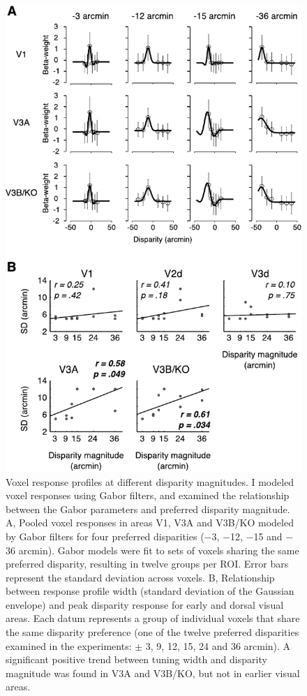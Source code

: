 \begin{figure}
  \centering
  \includegraphics{fig10}
  \caption[Voxel response profiles at different disparity magnitudes.]{Voxel response profiles at different disparity magnitudes. I modeled voxel responses using Gabor filters, and examined the relationship between the Gabor parameters and preferred disparity magnitude. A, Pooled voxel responses in areas V1, V3A and V3B/KO modeled by Gabor filters for four preferred disparities ($-$3, $-$12, $-$15 and $-$36 arcmin). Gabor models were fit to sets of voxels sharing the same preferred disparity, resulting in twelve groups per ROI. Error bars represent the standard deviation across voxels. B, Relationship between response profile width (standard deviation of the Gaussian envelope) and peak disparity response for early and dorsal visual areas. Each datum represents a group of individual voxels that share the same disparity preference (one of the twelve preferred disparities examined in the experiments: $\pm$ 3, 9, 12, 15, 24 and 36 arcmin). A significant positive trend between tuning width and disparity magnitude was found in V3A and V3B/KO, but not in earlier visual areas.}
  \label{fig:ch4fig10}
\end{figure}

